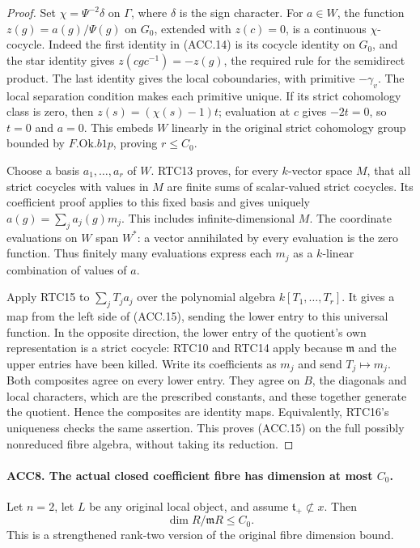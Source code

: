 \begin{proof}
Set \(\chi=\Psi^{-2}\delta\) on \(\Gamma\), where
\(\delta\) is the sign character.  For \(a\in W\), the function
\(z(g)=a(g)/\Psi(g)\) on \(G_0\), extended with \(z(c)=0\),
is a continuous \(\chi\)-cocycle.  Indeed the first identity in
(ACC.14) is its cocycle identity on \(G_0\), and the star identity
gives \(z(cgc^{-1})=-z(g)\), the required rule for the semidirect
product.  The last identity gives the local coboundaries, with
primitive \(-\gamma_v\).  The local separation condition makes
each primitive unique.  If its strict cohomology class is zero,
then \(z(s)=(\chi(s)-1)t\); evaluation at \(c\) gives
\(-2t=0\), so \(t=0\) and \(a=0\).  This embeds \(W\)
linearly in the original strict cohomology group bounded by
\(F.\mathrm{Ok}.b1p\), proving \(r\le C_0\).

Choose a basis \(a_1,\ldots,a_r\) of \(W\).  RTC13 proves,
for every \(k\)-vector space \(M\), that all strict cocycles
with values in \(M\) are finite sums of scalar-valued strict
cocycles.  Its coefficient proof applies to this fixed basis and
gives uniquely \(a(g)=\sum_j a_j(g)m_j\).  This includes
infinite-dimensional \(M\).  The coordinate evaluations on
\(W\) span \(W^*\): a vector annihilated by every evaluation
is the zero function.  Thus finitely many evaluations express
each \(m_j\) as a \(k\)-linear combination of values of \(a\).

Apply RTC15 to \(\sum_j T_j a_j\) over the polynomial algebra
\(k[T_1,\ldots,T_r]\).  It gives a map from the left side of
(ACC.15), sending the lower entry to this universal function.
In the opposite direction, the lower entry of the quotient's own
representation is a strict cocycle: RTC10 and RTC14 apply because
\(\mathfrak m\) and the upper entries have been killed.  Write
its coefficients as \(m_j\) and send \(T_j\mapsto m_j\).
Both composites agree on every lower entry.  They agree on \(B\),
the diagonals and local characters, which are the prescribed
constants, and these together generate the quotient.  Hence the
composites are identity maps.  Equivalently, RTC16's uniqueness
checks the same assertion.  This proves (ACC.15) on the full
possibly nonreduced fibre algebra, without taking its reduction.
\end{proof}

\paragraph{ACC8. The actual closed coefficient fibre has dimension at most \(C_0\).}
\label{claim:ACC8}
Let \(n=2\), let \(L\) be any original local object, and assume
\(\mathfrak t_+\not\subset x\).  Then
\[
                         \dim R/\mathfrak mR\le C_0.
                                                               \tag{ACC.16}
\]
This is a strengthened rank-two version of the original fibre
dimension bound.

